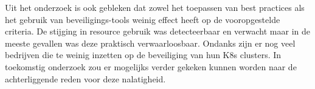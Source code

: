Uit het onderzoek is ook gebleken dat zowel het toepassen van best practices als het gebruik van beveiligings-tools weinig effect heeft op de vooropgestelde criteria. De stijging in resource gebruik was detecteerbaar en verwacht maar in de meeste gevallen was deze praktisch verwaarloosbaar. Ondanks zijn er nog veel bedrijven die te weinig inzetten op de beveiliging van hun K8s clusters. In toekomstig onderzoek zou er mogelijks verder gekeken kunnen worden naar de achterliggende reden voor deze nalatigheid.  